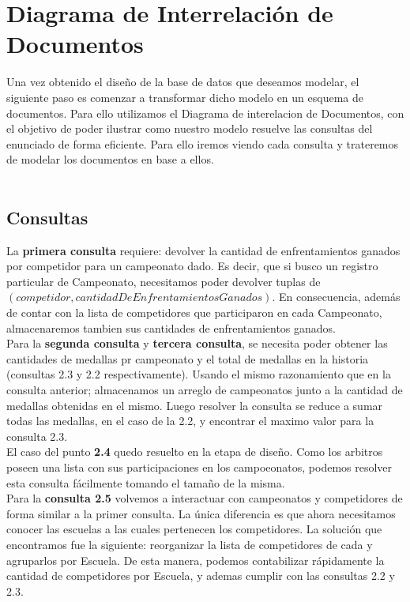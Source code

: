 \newpage
\section{Diagrama de Interrelación de Documentos}

Una vez obtenido el diseño de la base de datos que deseamos modelar, 
el siguiente paso es comenzar a transformar dicho modelo en un esquema 
de documentos. Para ello utilizamos el Diagrama de interelacion de 
Documentos, con el objetivo de poder ilustrar como nuestro modelo 
resuelve las consultas del enunciado de forma eficiente. Para ello
iremos viendo cada consulta y trateremos de modelar los documentos 
en base a ellos.\\ \\

\subsection{Consultas}

La \textbf{primera consulta} requiere: devolver la cantidad de enfrentamientos ganados 
por competidor para un campeonato dado. Es decir, que si busco un registro 
particular de Campeonato, necesitamos poder devolver tuplas de 
$(competidor,cantidadDeEnfrentamientosGanados)$. En consecuencia, además de
contar con la lista de competidores que participaron en cada Campeonato, 
almacenaremos tambien sus cantidades de enfrentamientos ganados.\\

Para la \textbf{segunda consulta} y \textbf{tercera consulta}, se necesita poder obtener las 
cantidades de medallas pr campeonato y el total de medallas en la historia
(consultas 2.3 y 2.2 respectivamente). Usando el mismo razonamiento que en 
la consulta anterior; almacenamos un arreglo de campeonatos junto a la cantidad 
de medallas obtenidas en el mismo. Luego resolver la consulta se reduce a sumar 
todas las medallas, en el caso de la 2.2, y encontrar el maximo valor para la 
consulta 2.3. \\

El caso del punto \textbf{2.4} quedo resuelto en la etapa de diseño. Como los arbitros 
poseen una lista con sus participaciones en los campoeonatos, podemos resolver 
esta consulta fácilmente tomando el tamaño de la misma. \\ 

Para la \textbf{consulta 2.5} volvemos a interactuar con campeonatos y competidores
de forma similar a la primer consulta. La única diferencia es que ahora 
necesitamos conocer las escuelas a las cuales pertenecen los competidores.
La solución que encontramos fue la siguiente: reorganizar la lista de competidores de 
cada y agruparlos por Escuela. De esta manera, podemos contabilizar rápidamente la
cantidad de competidores por Escuela, y ademas cumplir con las consultas 2.2 y 2.3.\\


